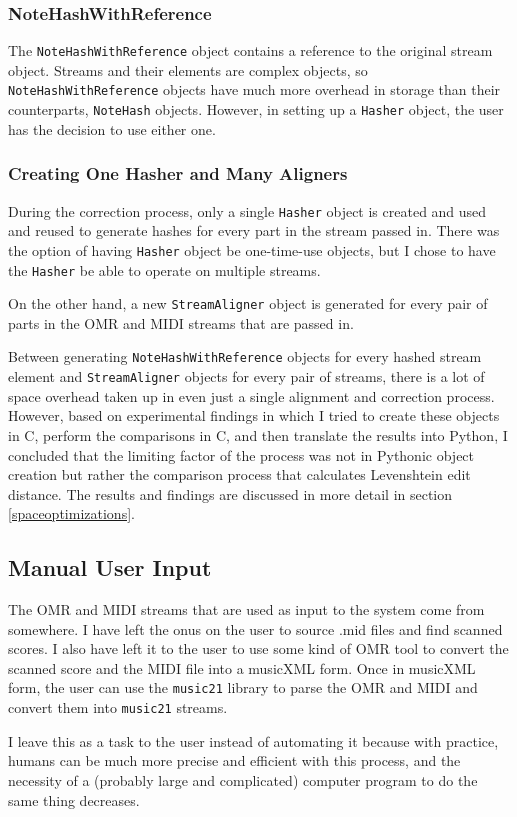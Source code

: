 \subsubsection{NoteHashWithReference}
The \texttt{NoteHashWithReference} object contains a reference to the original stream object. Streams and their elements are complex objects, so \texttt{NoteHashWithReference} objects have much more overhead in storage than their counterparts, \texttt{NoteHash} objects. However, in setting up a \texttt{Hasher} object, the user has the decision to use either one.   

\subsubsection{Creating One Hasher and Many Aligners}
During the correction process, only a single \texttt{Hasher} object is created and used and reused to generate hashes for every part in the stream passed in. There was the option of having \texttt{Hasher} object be one-time-use objects, but I chose to have the \texttt{Hasher} be able to operate on multiple streams. 

On the other hand, a new \texttt{StreamAligner} object is generated for every pair of parts in the OMR and MIDI streams that are passed in. 

Between generating \texttt{NoteHashWithReference} objects for every hashed stream element and \texttt{StreamAligner} objects for every pair of streams, there is a lot of space overhead taken up in even just a single alignment and correction process. However, based on experimental findings in which I tried to create these objects in C, perform the comparisons in C, and then translate the results into Python, I concluded that the limiting factor of the process was not in Pythonic object creation but rather the comparison process that calculates Levenshtein edit distance. The results and findings are discussed in more detail in section \ref{spaceoptimizations}.


\subsection{Manual User Input}
The OMR and MIDI streams that are used as input to the system come from somewhere. I have left the onus on the user to source .mid files and find scanned scores. I also have left it to the user to use some kind of OMR tool to convert the scanned score and the MIDI file into a musicXML form. Once in musicXML form, the user can use the \texttt{music21} library to parse the OMR and MIDI and convert them into \texttt{music21} streams. 

I leave this as a task to the user instead of automating it because with practice, humans can be much more precise and efficient with this process, and the necessity of a (probably large and complicated) computer program to do the same thing decreases. 
